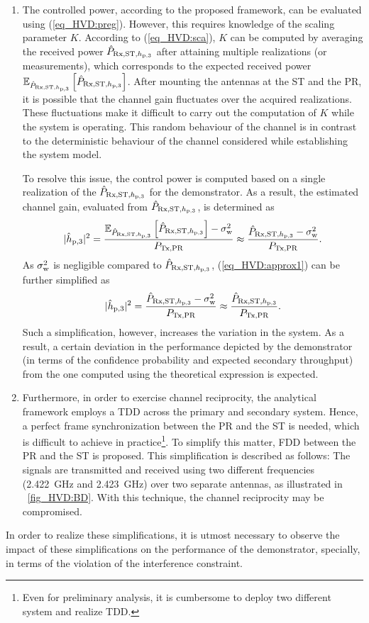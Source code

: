 \begin{enumerate}
	\item The controlled power, according to the proposed framework, can be evaluated using (\ref{eq_HVD:preg}). However, this requires knowledge of the scaling parameter $K$. According to (\ref{eq_HVD:sca}), $K$ can be computed by averaging the received power $\hat{P}_{\text{Rx,ST,$h_{\text{p,3}}$}}$ after attaining multiple realizations (or measurements), which corresponds to the expected received power ${\mathbb E}_{\hat{P}_{\text{Rx,ST,$h_{\text{p,3}}$}}}\left[ \hat{P}_{\text{Rx,ST,$h_{\text{p,3}}$}} \right]$. After mounting the antennas at the ST and the PR, it is possible that the channel gain fluctuates over the acquired realizations. These fluctuations make it difficult to carry out the computation of $K$ while the system is operating. This random behaviour of the channel is in contrast to the deterministic behaviour of the channel considered while establishing the system model. 

To resolve this issue, the control power is computed based on a single realization of the $\hat{P}_{\text{Rx,ST,$h_{\text{p,3}}$}}$ for the demonstrator. As a result, the estimated channel gain, evaluated from $\hat{P}_{\text{Rx,ST,$h_{\text{p,3}}$}}$, is determined as 
	\begin{equation}
		|\hat{h}_{\text{p,3}}|^2 = \frac{{\mathbb E}_{\hat{P}_{\text{Rx,ST,$h_{\text{p,3}}$}}}\left[ \hat{P}_{\text{Rx,ST,$h_{\text{p,3}}$}} \right]-\sigma^2_{\text{w}}}{P_{\text{Tx,PR}}} \approx \frac{\hat{P}_{\text{Rx,ST,$h_{\text{p,3}}$}}-\sigma^2_{\text{w}}}{P_{\text{Tx,PR}}}. 
		\label{eq_HVD:approx1}
	\end{equation}	
As $\sigma^2_{\text{w}}$ is negligible compared to $\hat{P}_{\text{Rx,ST,$h_{\text{p,3}}$}}$, (\ref{eq_HVD:approx1}) can be further simplified as 
	\begin{equation}
		|\hat{h}_{\text{p,3}}|^2 = \frac{\hat{P}_{\text{Rx,ST,$h_{\text{p,3}}$}}-\sigma^2_{\text{w}}}{P_{\text{Tx,PR}}} \approx \frac{\hat{P}_{\text{Rx,ST,$h_{\text{p,3}}$}}}{P_{\text{Tx,PR}}}.
		\label{eq_HVD:approx2}
	\end{equation}	
Such a simplification, however, increases the variation in the system. As a result, a certain deviation in the performance depicted by the demonstrator (in terms of the confidence probability and expected secondary throughput) from the one computed using the theoretical expression is expected. 
	\item Furthermore, in order to exercise channel reciprocity, the analytical framework employs a TDD across the primary and secondary system. Hence, a perfect frame synchronization between the PR and the ST is needed, which is difficult to achieve in practice\footnote{Even for preliminary analysis, it is cumbersome to deploy two different system and realize TDD.}. To simplify this matter, FDD between the PR and the ST is proposed. This simplification is described as follows: The signals are transmitted and received using two different frequencies (\SI{2.422}{GHz} and \SI{2.423}{GHz}) over two separate antennas, as illustrated in \figurename~\ref{fig_HVD:BD}. With this technique, the channel reciprocity may be compromised.	
\end{enumerate}
In order to realize these simplifications, it is utmost necessary to observe the impact of these simplifications on the performance of the demonstrator, specially, in terms of the violation of the interference constraint.


